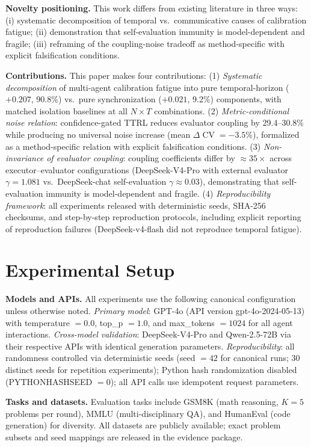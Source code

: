 \documentclass[11pt]{article}
\DeclareMathOperator{\CV}{CV}
\begin{document}
\textbf{Novelty positioning.} This work differs from existing literature in three ways: (i) systematic decomposition of temporal vs.\ communicative causes of calibration fatigue; (ii) demonstration that self-evaluation immunity is model-dependent and fragile; (iii) reframing of the coupling-noise tradeoff as method-specific with explicit falsification conditions.



	\textbf{Contributions.} This paper makes four contributions: (1) \emph{Systematic decomposition} of multi-agent calibration fatigue into pure temporal-horizon ($+0.207$, 90.8\%) vs.\ pure synchronization ($+0.021$, 9.2\%) components, with matched isolation baselines at all $N{\times}T$ combinations. (2) \emph{Metric-conditional noise relation}: confidence-gated TTRL reduces evaluator coupling by 29.4--30.8\% while producing no universal noise increase (mean $\Delta\CV=-3.5\%$), formalized as a method-specific relation with explicit falsification conditions. (3) \emph{Non-invariance of evaluator coupling}: coupling coefficients differ by $\approx 35\times$ across executor--evaluator configurations (DeepSeek-V4-Pro with external evaluator $\gamma=1.081$ vs.\ DeepSeek-chat self-evaluation $\gamma\approx 0.03$), demonstrating that self-evaluation immunity is model-dependent and fragile. (4) \emph{Reproducibility framework}: all experiments released with deterministic seeds, SHA-256 checksums, and step-by-step reproduction protocols, including explicit reporting of reproduction failures (DeepSeek-v4-flash did not reproduce temporal fatigue).\section{Experimental Setup}
\label{sec:experimental-setup}

\textbf{Models and APIs.} All experiments use the following canonical configuration unless otherwise noted. \textit{Primary model}: GPT-4o (API version gpt-4o-2024-05-13) with temperature $=0.0$, top\_p $=1.0$, and max\_tokens $=1024$ for all agent interactions. \textit{Cross-model validation}: DeepSeek-V4-Pro and Qwen-2.5-72B via their respective APIs with identical generation parameters. \textit{Reproducibility}: all randomness controlled via deterministic seeds (seed $=42$ for canonical runs; 30 distinct seeds for repetition experiments); Python hash randomization disabled (PYTHONHASHSEED $=0$); all API calls use idempotent request parameters.

\textbf{Tasks and datasets.} Evaluation tasks include GSM8K (math reasoning, $K{=}5$ problems per round), MMLU (multi-disciplinary QA), and HumanEval (code generation) for diversity. All datasets are publicly available; exact problem subsets and seed mappings are released in the evidence package.
\end{document}
